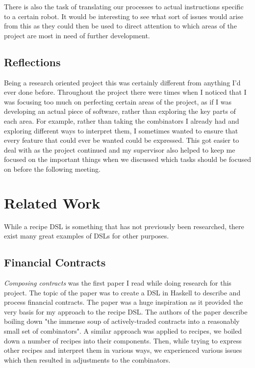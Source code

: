 \documentclass[11pt]{article}
\begin{document}
\medbreak

There is also the task of translating our processes to actual instructions specific to a certain
robot. It would be interesting to see what sort of issues would arise from this as they could then
be used to direct attention to which areas of the project are most in need of further development.

\subsection{Reflections}

Being a research oriented project this was certainly different from anything I'd ever done before.
Throughout the project there were times when I noticed that I was focusing too much on perfecting
certain areas of the project, as if I was developing an actual piece of software, rather than
exploring the key parts of each area. For example, rather than taking the combinators I already
had and exploring different ways to interpret them, I sometimes wanted to ensure that every feature
that could ever be wanted could be expressed. This got easier to deal with as the project
continued and my supervisor also helped to keep me focused on the important things when we discussed
which tasks should be focused on before the following meeting.

\section{Related Work}

While a recipe DSL is something that has not previously been researched, there exist many
great examples of DSLs for other purposes.

\subsection{Financial Contracts}

\textit{Composing contracts} \cite{contracts} was the first paper I read while doing
research for this project. The topic of the paper was to create a DSL in
Haskell to describe and process financial contracts. The paper was a huge
inspiration as it provided the very basis for my approach to the recipe DSL.
The authors of the paper describe boiling down "the immense soup of
actively-traded contracts into a reasonably small set of combinators".
A similar approach was applied to recipes, we boiled down a number of
recipes into their components. Then, while trying to express other
recipes and interpret them in various ways, we experienced various
issues which then resulted in adjustments to the combinators.
\end{document}
